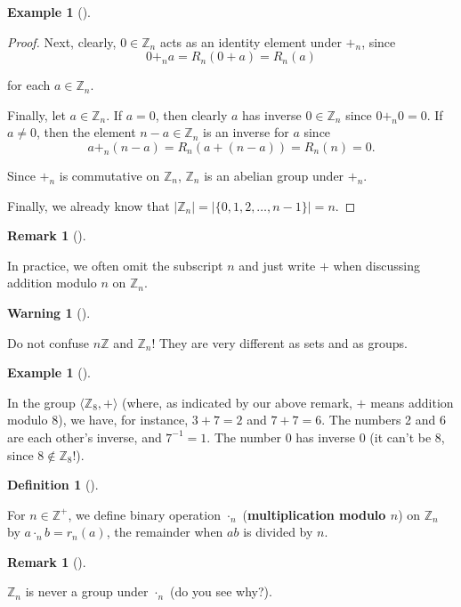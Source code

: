 \documentclass[10pt,]{book}
\newcommand{\terminology}[1]{\textbf{#1}}
\theoremstyle{plain}
\theoremstyle{definition}
\newtheorem{definition}[theorem]{Definition}
\theoremstyle{definition}
\newtheorem{remark}[theorem]{Remark}
\newtheorem{warning}[theorem]{Warning}
\theoremstyle{definition}
\newtheorem{example}[theorem]{Example}
\theoremstyle{definition}
\numberwithin{equation}{section}
\def\Z{\mathbb{Z}}
\begin{document}
\begin{example}[]
\begin{proof}
              Next, clearly, \(0\in \Z_n\) acts as an identity element
              under \(+_n\), since
\begin{equation*}

                0+_n a =R_n(0+a)=R_n(a)
              
\end{equation*}

              for each
              \(a\in \Z_n\).
\par
Finally, let \(a\in \Z_n\).  If \(a=0\), then clearly \(a\) has
              inverse \(0\in \Z_n\) since \(0+_n 0 = 0\). If \(a\neq 0\), then
              the element \(n-a\in \Z_n\) is an inverse for \(a\) since
\begin{equation*}

                a+_n(n-a)=R_n(a+(n-a))=R_n(n)=0.
              
\end{equation*}

\par

        Since \(+_n\) is commutative on \(\Z_n\), \(\Z_n\) is an abelian group under \(+_n\). %
\par

Finally, we already know that \(|\Z_n|=|\{0,1,2,\ldots,n-1\}|=n\).
\end{proof}
\end{example}
\begin{remark}[]\label{remark-14}

      In practice, we often omit the
      subscript \(n\) and just write \(+\) when discussing addition
      modulo \(n\) on \(\Z_n\).
\end{remark}
\begin{warning}[]\label{warning-11}

      Do not confuse \(n\Z\) and \(\Z_n\)! They are very different as sets and as groups.
\end{warning}
\begin{example}[]\label{example-19}

        In the group \(\langle \Z_8,+\rangle\) (where, as indicated by our above remark, \(+\) means addition modulo \(8\)), we have, for instance, \(3+7=2\) and \(7+7=6\).
        The numbers 2 and 6 are each other's inverse, and \(7^{-1}=1\). The number \(0\) has inverse \(0\) (it can't be \(8\), since \(8\not\in \Z_8\)!).
\end{example}
\begin{definition}[{}]\label{definition-26}

        For \(n\in \Z^+\), we define binary operation \(\cdot_n\) (\terminology{multiplication modulo \(n\)}) on \(\Z_n\) by \(a\cdot_n b = r_n(a)\), the remainder when \(ab\) is divided by \(n\).
\end{definition}
\begin{remark}[]\label{remark-15}

      \(\Z_n\) is never a group under \(\cdot_n\) (do you see why?).
\end{remark}
\par
\end{document}
